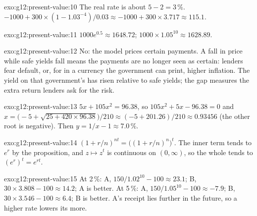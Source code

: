 \begin{solution}{exo:g12:present-value:10}
The real rate is about $5 - 2 = 3\,\%$. $-1000 + 300 \times (1 - 1.03^{-4})/0.03 \approx -1000 + 300 \times 3.717 \approx 115.1$.
\end{solution}

\begin{solution}{exo:g12:present-value:11}
$1000e^{0.5} \approx 1648.72$; $1000 \times 1.05^{10} \approx 1628.89$.
\end{solution}

\begin{solution}{exo:g12:present-value:12}
No: the model prices certain payments. A fall in price while safe yields fall means the payments are no longer seen as certain: lenders fear default, or, for  in a
currency the government can print, higher inflation. The yield on that government's  has risen relative to safe yields; the gap measures the extra return lenders
ask for the risk.
\end{solution}

\begin{solution}{exo:g12:present-value:13}
$5x + 105x^2 = 96.38$, so $105x^2 + 5x - 96.38 = 0$ and $x = \bigl(-5 + \sqrt{25 + 420 \times 96.38}\bigr)/210 \approx (-5 + 201.26)/210 \approx 0.93456$ (the other root is
negative). Then $y = 1/x - 1 \approx 7.0\,\%$.
\end{solution}

\begin{solution}{exo:g12:present-value:14}
$(1 + r/n)^{nt} = \bigl((1 + r/n)^n\bigr)^t$. The inner term tends to $e^r$ by the proposition, and $z \mapsto z^t$ is continuous on $(0, \infty)$, so the whole tends to
$(e^r)^t = e^{rt}$.
\end{solution}

\begin{solution}{exo:g12:present-value:15}
At 2\,\%: A, $150/1.02^{10} - 100 \approx 23.1$; B, $30 \times 3.808 - 100 \approx 14.2$; A is better. At 5\,\%: A, $150/1.05^{10} - 100 \approx -7.9$; B,
$30 \times 3.546 - 100 \approx 6.4$; B is better. A's receipt lies further in the future, so a higher rate lowers its  more.
\end{solution}

